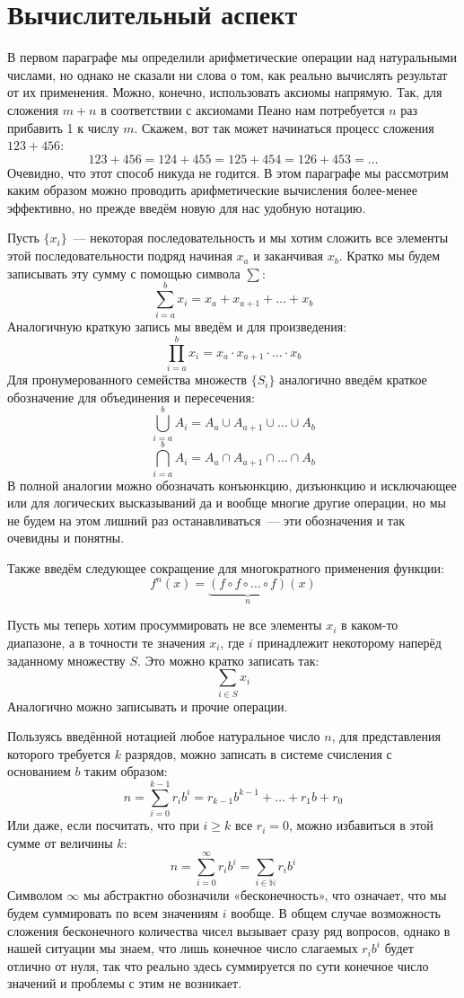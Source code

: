 \section{Вычислительный аспект}

В первом параграфе мы определили арифметические операции над натуральными числами, но однако не сказали ни слова о том, как реально вычислять результат от их применения. Можно, конечно, использовать аксиомы напрямую. Так, для сложения $m+n$ в соответствии с аксиомами Пеано нам потребуется $n$ раз прибавить 1 к числу $m$. Скажем, вот так может начинаться процесс сложения $123+456$:
$$123+456 = 124 + 455 = 125 + 454 = 126 + 453 = \ldots$$
Очевидно, что этот способ никуда не годится. В этом параграфе мы рассмотрим каким образом можно проводить арифметические вычисления более-менее эффективно, но прежде введём новую для нас удобную нотацию.

Пусть $\{x_i\}$~— некоторая последовательность и мы хотим сложить все элементы этой последовательности подряд начиная $x_a$ и заканчивая $x_b$. Кратко мы будем записывать эту сумму с помощью символа $\sum$:
$$\sum_{i=a}^b x_i = x_a + x_{a+1} + \ldots + x_b$$
Аналогичную краткую запись мы введём и для произведения:
$$\prod_{i=a}^b x_i = x_a \cdot x_{a+1} \cdot \ldots \cdot x_b$$
Для пронумерованного семейства множеств $\{S_i\}$ аналогично введём краткое обозначение для объединения и пересечения:
$$\bigcup_{i=a}^b A_i = A_a \cup A_{a+1}\cup\ldots\cup A_b$$
$$\bigcap_{i=a}^b A_i = A_a \cap A_{a+1}\cap\ldots\cap A_b$$
В полной аналогии можно обозначать конъюнкцию, дизъюнкцию и исключающее или  для логических высказываний да и вообще многие другие операции, но мы не будем на этом лишний раз останавливаться~— эти обозначения и так очевидны и понятны.

Также введём следующее сокращение для многократного применения функции:
$$f^n(x) = \underbrace{(f\circ f\circ\ldots\circ f)}_n (x)$$

Пусть мы теперь хотим просуммировать не все элементы $x_i$ в каком-то диапазоне, а в точности те значения $x_i$, где $i$ принадлежит некоторому наперёд заданному множеству $S$. Это можно кратко записать так:
$$\sum_{i\in S} x_i$$
Аналогично можно записывать и прочие операции.

Пользуясь введённой нотацией любое натуральное число $n$, для представления которого требуется $k$ разрядов, можно записать в системе счисления с основанием $b$ таким образом:
$$n = \sum_{i=0}^{k-1} r_i b^i = r_{k - 1} b^{k-1} + \ldots + r_1 b + r_0$$
Или даже, если посчитать, что при $i\ge k$ все $r_i = 0$, можно избавиться в этой сумме от величины $k$:
$$n = \sum_{i=0}^\infty r_i b^i = \sum_{i\in\mathbb{N}} r_i b^i$$
Символом $\infty$ мы абстрактно обозначили «бесконечность», что означает, что мы будем суммировать по всем значениям $i$ вообще. В общем случае возможность сложения бесконечного количества чисел вызывает сразу ряд вопросов, однако в нашей ситуации мы знаем, что лишь конечное число слагаемых $r_ib^i$ будет отлично от нуля, так что реально здесь суммируется по сути конечное число значений и проблемы с этим не возникает.

